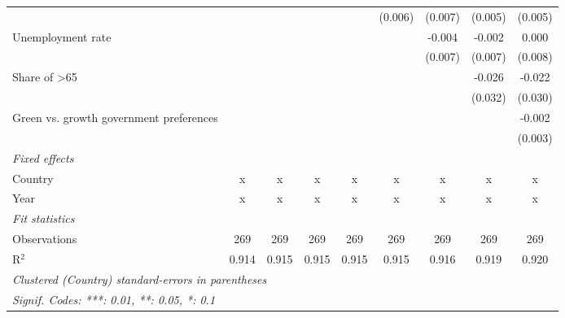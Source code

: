 \begin{table}[htbp]
\begin{tabular}{lcccccccc}
                                                         &              &              &              &              & (0.006)      & (0.007)     & (0.005) & (0.005)\\   
      Unemployment rate                                  &              &              &              &              &              & -0.004      & -0.002  & 0.000\\   
                                                         &              &              &              &              &              & (0.007)     & (0.007) & (0.008)\\   
      Share of >65                                       &              &              &              &              &              &             & -0.026  & -0.022\\   
                                                         &              &              &              &              &              &             & (0.032) & (0.030)\\   
      Green vs. growth government preferences            &              &              &              &              &              &             &         & -0.002\\   
                                                         &              &              &              &              &              &             &         & (0.003)\\   
      \emph{Fixed effects}\\
      Country                                            & x            & x            & x            & x            & x            & x           & x       & x\\  
      Year                                               & x            & x            & x            & x            & x            & x           & x       & x\\  
      \midrule \emph{Fit statistics}\\
      Observations                                       & 269          & 269          & 269          & 269          & 269          & 269         & 269     & 269\\  
      R$^2$                                              & 0.914        & 0.915        & 0.915        & 0.915        & 0.915        & 0.916       & 0.919   & 0.920\\  
      \midrule
      \multicolumn{9}{l}{\emph{Clustered (Country) standard-errors in parentheses}}\\
      \multicolumn{9}{l}{\emph{Signif. Codes: ***: 0.01, **: 0.05, *: 0.1}}\\
   \end{tabular}
\end{table}


